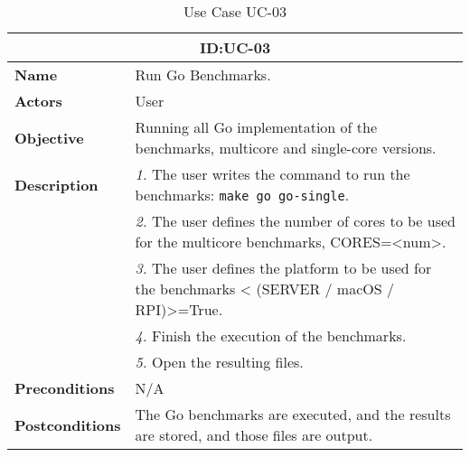 \begin{table}[H]
    \centering
    \begin{tabular}{l p{10cm}}
        \toprule
        \multicolumn{2}{c}{\textbf{ID:\@ UC-03}} \\
        \toprule
        \textbf{Name}                         &  Run Go Benchmarks. \\
        \textbf{Actors}                       &  User \\
        \textbf{Objective}                    &  Running all Go implementation of the benchmarks, multicore and single-core versions. \\
        \multirow{1}{*}{\textbf{Description}} & \textsl{1.} The user writes the command to run the benchmarks: \texttt{make go go-single}.\\
                                              & \textsl{2.} The user defines the number of cores to be used for the multicore benchmarks, CORES=<num>.\\
                                              & \textsl{3.} The user defines the platform to be used for the benchmarks < (SERVER / macOS / RPI)>=True.\\
                                              & \textsl{4.} Finish the execution of the benchmarks.\\
                                              & \textsl{5.} Open the resulting files.\\
        \textbf{Preconditions}                &  N/A \\
        \textbf{Postconditions}               &  The Go benchmarks are executed, and the results are stored, and those files are output. \\
    \end{tabular}
    \caption{Use Case UC-03}\label{tab:uc-03}
\end{table}


